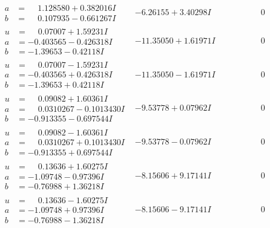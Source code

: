 \documentclass[1p]{elsarticle_modified}
\theoremstyle{definition}
\begin{document}
$$\begin{array}{c|c|c}
\begin{aligned}
a &= \phantom{-}1.128580 + 0.382016 I \\
b &= \phantom{-}0.107935 - 0.661267 I\end{aligned}
 & -6.26155 + 3.40298 I & \phantom{-0.000000 } 0 \\ \hline\begin{aligned}
u &= \phantom{-}0.07007 + 1.59231 I \\
a &= -0.403565 - 0.426318 I \\
b &= -1.39653 - 0.42118 I\end{aligned}
 & -11.35050 + 1.61971 I & \phantom{-0.000000 } 0 \\ \hline\begin{aligned}
u &= \phantom{-}0.07007 - 1.59231 I \\
a &= -0.403565 + 0.426318 I \\
b &= -1.39653 + 0.42118 I\end{aligned}
 & -11.35050 - 1.61971 I & \phantom{-0.000000 } 0 \\ \hline\begin{aligned}
u &= \phantom{-}0.09082 + 1.60361 I \\
a &= \phantom{-}0.0310267 - 0.1013430 I \\
b &= -0.913355 - 0.697544 I\end{aligned}
 & -9.53778 + 0.07962 I & \phantom{-0.000000 } 0 \\ \hline\begin{aligned}
u &= \phantom{-}0.09082 - 1.60361 I \\
a &= \phantom{-}0.0310267 + 0.1013430 I \\
b &= -0.913355 + 0.697544 I\end{aligned}
 & -9.53778 - 0.07962 I & \phantom{-0.000000 } 0 \\ \hline\begin{aligned}
u &= \phantom{-}0.13636 + 1.60275 I \\
a &= -1.09748 - 0.97396 I \\
b &= -0.76988 + 1.36218 I\end{aligned}
 & -8.15606 + 9.17141 I & \phantom{-0.000000 } 0 \\ \hline\begin{aligned}
u &= \phantom{-}0.13636 - 1.60275 I \\
a &= -1.09748 + 0.97396 I \\
b &= -0.76988 - 1.36218 I\end{aligned}
 & -8.15606 - 9.17141 I & \phantom{-0.000000 } 0 \\ \hline\begin{aligned}

\end{aligned}
\end{array}$$
\end{document}
